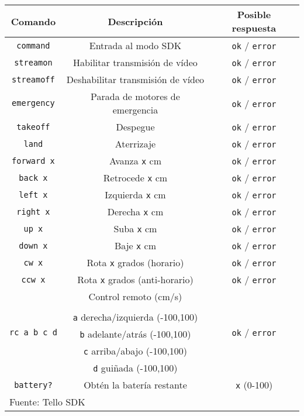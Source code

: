 \documentclass[../main.tex]{subfiles}
\begin{document}
\begin{table}[H]
	{\begin{tabular}{|c|c|c|}
		\hline
		\textbf{Comando} & \textbf{Descripción} & \textbf{Posible respuesta} \\
		\hline
        \lstinline{command} & Entrada al modo SDK & \lstinline{ok} / \lstinline{error} \\
		\hline
        \lstinline{streamon} & Habilitar transmisión de vídeo & \lstinline{ok} / \lstinline{error} \\
		\hline
        \lstinline{streamoff} & Deshabilitar transmisión de vídeo & \lstinline{ok} / \lstinline{error} \\
		\hline
        \lstinline{emergency} & Parada de motores de emergencia & \lstinline{ok} / \lstinline{error} \\
		\hline
        \lstinline{takeoff} & Despegue & \lstinline{ok} / \lstinline{error} \\
		\hline
        \lstinline{land} & Aterrizaje & \lstinline{ok} / \lstinline{error} \\
		\hline
        \lstinline{forward x} & Avanza \lstinline{x} cm & \lstinline{ok} / \lstinline{error} \\
		\hline
        \lstinline{back x} & Retrocede \lstinline{x} cm & \lstinline{ok} / \lstinline{error} \\
		\hline
        \lstinline{left x} & Izquierda \lstinline{x} cm & \lstinline{ok} / \lstinline{error} \\
		\hline
        \lstinline{right x} & Derecha \lstinline{x} cm & \lstinline{ok} / \lstinline{error} \\
		\hline
        \lstinline{up x} & Suba \lstinline{x} cm & \lstinline{ok} / \lstinline{error} \\
		\hline
        \lstinline{down x} & Baje \lstinline{x} cm & \lstinline{ok} / \lstinline{error} \\
		\hline
        \lstinline{cw x} & Rota \lstinline{x} grados (horario) & \lstinline{ok} / \lstinline{error} \\
		\hline
        \lstinline{ccw x} & Rota \lstinline{x} grados (anti-horario) & \lstinline{ok} / \lstinline{error} \\
		\hline
        \multirow{6}{*}{\lstinline{rc a b c d}} & Control remoto (cm/s) & \multirow{6}{*}{\lstinline{ok} / \lstinline{error}} \\
         & & \\
         & \lstinline{a} derecha/izquierda (-100,100) & \\
         & \lstinline{b} adelante/atrás (-100,100) & \\
         & \lstinline{c} arriba/abajo (-100,100) & \\
         & \lstinline{d} guiñada (-100,100) & \\
		\hline
        \lstinline{battery?} & Obtén la batería restante & \lstinline{x} (0-100) \\
		\hline
		\multicolumn{3}{l}{Fuente: Tello SDK}
	\end{tabular}}
\end{table}
\end{document}
